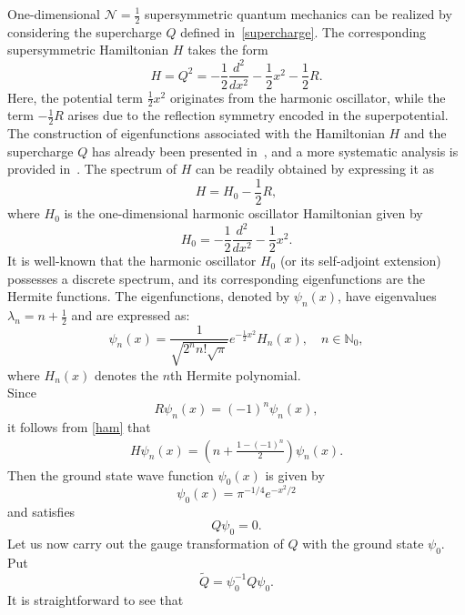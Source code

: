 \documentclass[12 pt]{amsart}
\numberwithin{equation}{section}
\begin{document}
One-dimensional \( \mathcal{N} = \tfrac{1}{2} \) supersymmetric quantum mechanics can be realized by considering the supercharge \( Q \) defined in~\eqref{supercharge}. The corresponding supersymmetric Hamiltonian \( H \) takes the form
\begin{equation}
H = Q^{2} = -\frac{1}{2} \frac{d^2}{dx^2} - \frac{1}{2} x^2 - \frac{1}{2} R.
\end{equation}
Here, the potential term \( \frac{1}{2}x^2 \) originates from the harmonic oscillator, while the term \( -\frac{1}{2} R \) arises due to the reflection symmetry encoded in the superpotential. The construction of eigenfunctions associated with the Hamiltonian \( H \) and the supercharge \( Q \) has already been presented in~\cite{S3}, and a more systematic analysis is provided in~\cite{S4}. The spectrum of \( H \) can be readily obtained by expressing it as
\begin{equation}\label{ham}
H = H_0 - \frac{1}{2} R,
\end{equation}
where \( H_0 \) is the one-dimensional harmonic oscillator Hamiltonian given by
\[
H_0 = -\frac{1}{2} \frac{d^2}{dx^2} - \frac{1}{2} x^2.
\]
It is well-known  that the harmonic oscillator $H_0$ (or its self-adjoint extension) possesses a discrete spectrum, and its corresponding eigenfunctions are the  Hermite functions. The eigenfunctions, denoted by $\psi_{n}(x)$, have eigenvalues $\lambda_{n}= n  +\frac{1}{2}$ and are expressed as:\begin{equation}
    \psi_{n}(x)= \frac{1}{\sqrt{2^nn!\sqrt{\pi}}}e^{-\frac{1}{2}x^2}H_{n}(x),\quad n\in \mathbb{N}_0,
\end{equation}
where $H_n(x)$ denotes the $n$th Hermite polynomial.\\
Since $$R\psi_{n}(x)=(-1)^n\psi_{n}(x),$$  it follows from \eqref{ham} that
\begin{align}
H\psi_n(x)=(n+\frac{1-(-1)^n}{2})\psi_n(x).
\end{align}
Then the ground state wave function $\psi_0(x)$ is given by
\begin{equation*}
\psi_0(x)=\pi ^{-1/4}e^{-x^2/2}
\end{equation*}
and satisfies
\begin{equation*}
Q\psi_0=0.
\end{equation*}
Let us now carry out the gauge transformation of $Q$ with the ground state $\psi_0$.
Put \begin{equation*}\widetilde{Q}=\psi_0^{-1}Q\psi_0
.\end{equation*}
It is straightforward to see that
\end{document}
